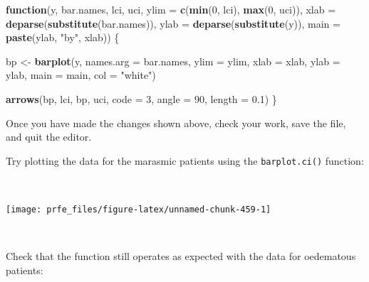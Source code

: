 \documentclass[12pt,a4paper]{book}
\newenvironment{Shaded}{\begin{snugshade}}{\end{snugshade}}
\newcommand{\KeywordTok}[1]{\textcolor[rgb]{0.13,0.29,0.53}{\textbf{#1}}}
\newcommand{\DataTypeTok}[1]{\textcolor[rgb]{0.13,0.29,0.53}{#1}}
\newcommand{\DecValTok}[1]{\textcolor[rgb]{0.00,0.00,0.81}{#1}}
\newcommand{\FloatTok}[1]{\textcolor[rgb]{0.00,0.00,0.81}{#1}}
\newcommand{\StringTok}[1]{\textcolor[rgb]{0.31,0.60,0.02}{#1}}
\newcommand{\ControlFlowTok}[1]{\textcolor[rgb]{0.13,0.29,0.53}{\textbf{#1}}}
\newcommand{\OperatorTok}[1]{\textcolor[rgb]{0.81,0.36,0.00}{\textbf{#1}}}
\newcommand{\NormalTok}[1]{#1}
\theoremstyle{definition}
\theoremstyle{definition}
\theoremstyle{definition}
\theoremstyle{remark}
\begin{document}
\begin{Shaded}
\begin{Highlighting}[]
\ControlFlowTok{function}\NormalTok{(y, bar.names, lci, uci,}
         \DataTypeTok{ylim =} \KeywordTok{c}\NormalTok{(}\KeywordTok{min}\NormalTok{(}\DecValTok{0}\NormalTok{, lci), }\KeywordTok{max}\NormalTok{(}\DecValTok{0}\NormalTok{, uci)),}
         \DataTypeTok{xlab =} \KeywordTok{deparse}\NormalTok{(}\KeywordTok{substitute}\NormalTok{(bar.names)),}
         \DataTypeTok{ylab =} \KeywordTok{deparse}\NormalTok{(}\KeywordTok{substitute}\NormalTok{(y)),}
         \DataTypeTok{main =} \KeywordTok{paste}\NormalTok{(ylab, }\StringTok{"by"}\NormalTok{, xlab)) \{}

\NormalTok{  bp <-}\StringTok{ }\KeywordTok{barplot}\NormalTok{(y, }\DataTypeTok{names.arg =}\NormalTok{ bar.names,  }\DataTypeTok{ylim =}\NormalTok{ ylim, }\DataTypeTok{xlab =}\NormalTok{ xlab,}
                \DataTypeTok{ylab =}\NormalTok{ ylab, }\DataTypeTok{main =}\NormalTok{ main, }\DataTypeTok{col =} \StringTok{"white"}\NormalTok{)}
     
  \KeywordTok{arrows}\NormalTok{(bp, lci, bp, uci, }\DataTypeTok{code =} \DecValTok{3}\NormalTok{, }\DataTypeTok{angle =} \DecValTok{90}\NormalTok{, }\DataTypeTok{length =} \FloatTok{0.1}\NormalTok{)}
\NormalTok{\}}
\end{Highlighting}
\end{Shaded}

\newpage

Once you have made the changes shown above, check your work, save the
file, and quit the editor.

Try plotting the data for the marasmic patients using the
\texttt{barplot.ci()} function:

~

\begin{Shaded}
\end{Shaded}

\begin{center}\texttt{[image: prfe\_files/figure-latex/unnamed-chunk-459-1]} \end{center}

~

Check that the function still operates as expected with the data for
oedematous patients:
\end{document}
